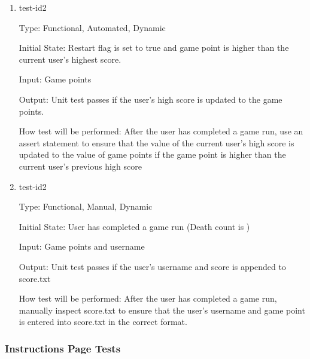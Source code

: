 \documentclass[12pt, titlepage]{article}
\begin{document}
\begin{enumerate}
\item{test-id2\\}

Type: Functional, Automated, Dynamic 
					
Initial State: Restart flag is set to true and game point is higher than the current user's highest score.
					
Input: Game points
					
Output: Unit test passes if the user's high score is updated to the game points.
					
How test will be performed: After the user has completed a game run, use an assert statement to ensure that the value of the current user's high score is updated to the value of game points if the game point is higher than the current user's previous high score

\item{test-id2\\}

Type: Functional, Manual, Dynamic
					
Initial State: User has completed a game run (Death count is )
					
Input: Game points and username
					
Output: Unit test passes if the user's username and score is appended to score.txt
					
How test will be performed: After the user has completed a game run, manually inspect score.txt to ensure that the user's username and game point is entered into score.txt in the correct format.

\end{enumerate}

\subsubsection{Instructions Page Tests}
\end{document}
